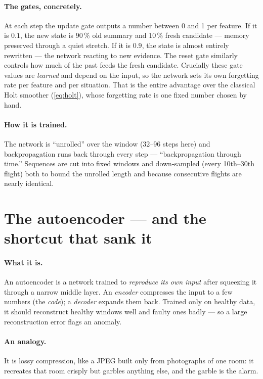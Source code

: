 \paragraph{The gates, concretely.} At each step the update gate outputs a number between 0 and
1 per feature. If it is $0.1$, the new state is $90\,\%$ old summary and $10\,\%$ fresh
candidate --- memory preserved through a quiet stretch. If it is $0.9$, the state is almost
entirely rewritten --- the network reacting to new evidence. The reset gate similarly controls
how much of the past feeds the fresh candidate. Crucially these gate values are \emph{learned}
and depend on the input, so the network sets its own forgetting rate per feature and per
situation. That is the entire advantage over the classical Holt smoother
(\cref{eq:holt}), whose forgetting rate is one fixed number chosen by hand.

\paragraph{How it is trained.} The network is ``unrolled'' over the window (32--96 steps here)
and backpropagation runs back through every step --- ``backpropagation through time.''
Sequences are cut into fixed windows and down-sampled (every 10th--30th flight) both to bound
the unrolled length and because consecutive flights are nearly identical.

\section{The autoencoder --- and the shortcut that sank it}
\label{sec:ml-ae}

\paragraph{What it is.} An autoencoder is a network trained to \emph{reproduce its own input}
after squeezing it through a narrow middle layer. An \emph{encoder} compresses the input to a
few numbers (the \emph{code}); a \emph{decoder} expands them back. Trained only on healthy
data, it should reconstruct healthy windows well and faulty ones badly --- so a large
reconstruction error flags an anomaly.

\paragraph{An analogy.} It is lossy compression, like a JPEG built only from photographs of
one room: it recreates that room crisply but garbles anything else, and the garble is the
alarm.

